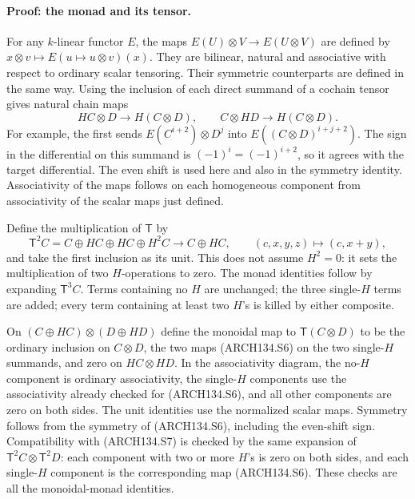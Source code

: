 \paragraph{Proof: the monad and its tensor.}
For any $k$-linear functor $E$, the maps
$E(U)\otimes V\to E(U\otimes V)$ are defined by
$x\otimes v\mapsto E(u\mapsto u\otimes v)(x)$.
They are bilinear, natural and associative with respect to
ordinary scalar tensoring.  Their symmetric counterparts are
defined in the same way.
Using the inclusion of each direct summand of a cochain tensor
gives natural chain maps
\[
 HC\otimes D\longrightarrow H(C\otimes D),\qquad
 C\otimes HD\longrightarrow H(C\otimes D).
 \tag{ARCH134.S6}
\]
For example, the first sends
$E(C^{i+2})\otimes D^j$ into
$E((C\otimes D)^{i+j+2})$.  The sign in the differential on
this summand is $(-1)^i=(-1)^{i+2}$, so it agrees with the
target differential.  The even shift is used here and also
in the symmetry identity.  Associativity of the maps follows
on each homogeneous component from associativity of the scalar
maps just defined.

Define the multiplication of $\mathsf T$ by
\[
 \mathsf T^2C=C\oplus HC\oplus HC\oplus H^2C
       \longrightarrow C\oplus HC,
       \qquad (c,x,y,z)\longmapsto(c,x+y),
 \tag{ARCH134.S7}
\]
and take the first inclusion as its unit.  This does not assume
$H^2=0$: it sets the multiplication of two $H$-operations to zero.
The monad identities follow by expanding $\mathsf T^3C$.
Terms containing no $H$ are unchanged; the three single-$H$
terms are added; every term containing at least two $H$'s is
killed by either composite.

On
$(C\oplus HC)\otimes(D\oplus HD)$ define the monoidal map
to $\mathsf T(C\otimes D)$ to be the ordinary inclusion on
$C\otimes D$, the two maps (ARCH134.S6) on the two single-$H$
summands, and zero on $HC\otimes HD$.  In the associativity
diagram, the no-$H$ component is ordinary associativity,
the single-$H$ components use the associativity already checked
for (ARCH134.S6), and all other components are zero on both
sides.  The unit identities use the normalized scalar maps.
Symmetry follows from the symmetry of (ARCH134.S6), including
the even-shift sign.  Compatibility with (ARCH134.S7) is checked
by the same expansion of
$\mathsf T^2C\otimes\mathsf T^2D$: each component with two
or more $H$'s is zero on both sides, and each single-$H$
component is the corresponding map (ARCH134.S6).  These
checks are all the monoidal-monad identities.

